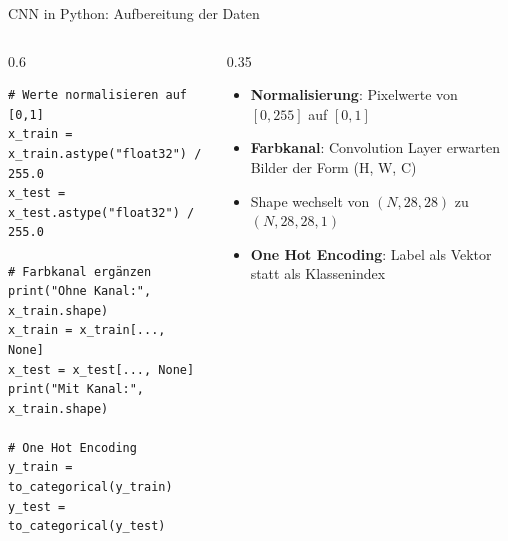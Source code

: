 \begin{frame}[fragile]{CNN in Python: Aufbereitung der Daten}
\begin{columns}
\begin{column}{0.6\textwidth}
\begin{verbatim}
# Werte normalisieren auf [0,1]
x_train = x_train.astype("float32") / 255.0
x_test = x_test.astype("float32") / 255.0

# Farbkanal ergänzen
print("Ohne Kanal:", x_train.shape)
x_train = x_train[..., None]
x_test = x_test[..., None]
print("Mit Kanal:", x_train.shape)

# One Hot Encoding
y_train = to_categorical(y_train)
y_test = to_categorical(y_test)
\end{verbatim}
\end{column}
\begin{column}{0.35\textwidth}
\begin{itemize}
  \item \textbf{Normalisierung}: Pixelwerte von $[0,255]$ auf $[0,1]$
  \item \textbf{Farbkanal}: Convolution Layer erwarten Bilder der Form (H, W, C)
  \item Shape wechselt von $(N,28,28)$ zu $(N,28,28,1)$
  \item \textbf{One Hot Encoding}: Label als Vektor statt als Klassenindex
\end{itemize}
\end{column}
\end{columns}
\end{frame}

